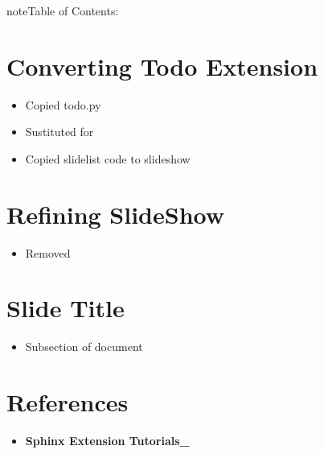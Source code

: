 \documentclass[letterpaper,12pt,english,openany,oneside]{sphinxmanual}
\begin{document}
\begin{sphinxadmonition}{note}{\label{\detokenize{index:id1}}Table of Contents:}
\sphinxstepscope


\chapter{Converting Todo Extension}
\label{\detokenize{slides/index-slides:converting-todo-extension}}\label{\detokenize{slides/index-slides::doc}}\begin{itemize}
\item {} 
\sphinxAtStartPar
Copied todo.py

\item {} 
\sphinxAtStartPar
Sustituted  for 

\item {} 
\sphinxAtStartPar
Copied slidelist code to slideshow

\end{itemize}


\chapter{Refining SlideShow}
\label{\detokenize{slides/index-slides:refining-slideshow}}\begin{itemize}
\item {} 
\sphinxAtStartPar
Removed 

\end{itemize}


\chapter{Slide Title}
\label{\detokenize{slides/index-slides:slide-title}}\begin{itemize}
\item {} 
\sphinxAtStartPar
Subsection of document

\end{itemize}


\chapter{References}
\label{\detokenize{slides/index-slides:references}}\begin{itemize}
\item {} 
\sphinxAtStartPar
{\color{red}\bfseries{}\textasciigrave{}Sphinx Extension Tutorials\textasciigrave{}\_}

\end{itemize}
\end{sphinxadmonition}
\end{document}
